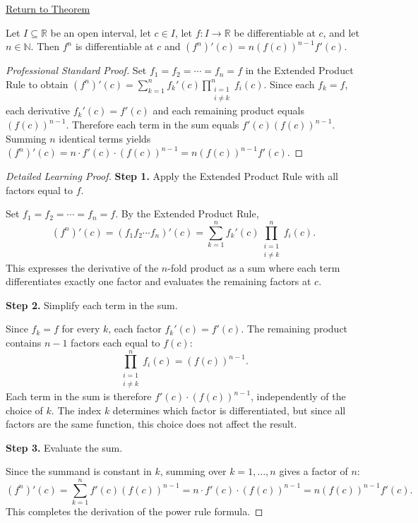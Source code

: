 \newpage
{}
\label{prf:special-case-product-rule}

\begin{remark*}[Return]
\hyperref[cor:power-rule-special-case]{Return to Theorem}
\end{remark*}

\begin{corollary*}
Let $I \subseteq \mathbb{R}$ be an open interval, let $c \in I$, let $f : I \to \mathbb{R}$ be differentiable at $c$, and let $n \in \mathbb{N}$. Then $f^n$ is differentiable at $c$ and $(f^n)'(c) = n(f(c))^{n-1}f'(c)$.
\end{corollary*}

\begin{proof}[Professional Standard Proof]
\LRAProofBodyStart
Set $f_1 = f_2 = \cdots = f_n = f$ in the Extended Product Rule to obtain $(f^n)'(c) = \sum_{k=1}^{n} f_k'(c) \prod_{\substack{i=1\\i\neq k}}^{n} f_i(c)$. Since each $f_k = f$, each derivative $f_k'(c) = f'(c)$ and each remaining product equals $(f(c))^{n-1}$. Therefore each term in the sum equals $f'(c)(f(c))^{n-1}$. Summing $n$ identical terms yields $(f^n)'(c) = n \cdot f'(c) \cdot (f(c))^{n-1} = n(f(c))^{n-1}f'(c)$.
\end{proof}

\begin{proof}[Detailed Learning Proof]
\LRAProofBodyStart

\textbf{Step 1.} Apply the Extended Product Rule with all factors equal to $f$.

Set $f_1 = f_2 = \cdots = f_n = f$. By the Extended Product Rule,
\[
  (f^n)'(c) = (f_1 f_2 \cdots f_n)'(c) = \sum_{k=1}^{n} f_k'(c) \prod_{\substack{i=1\\i\neq k}}^{n} f_i(c).
\]
This expresses the derivative of the $n$-fold product as a sum where each term differentiates exactly one factor and evaluates the remaining factors at $c$.

\textbf{Step 2.} Simplify each term in the sum.

Since $f_k = f$ for every $k$, each factor $f_k'(c) = f'(c)$. The remaining product contains $n-1$ factors each equal to $f(c)$:
\[
  \prod_{\substack{i=1\\i\neq k}}^{n} f_i(c) = (f(c))^{n-1}.
\]
Each term in the sum is therefore $f'(c) \cdot (f(c))^{n-1}$, independently of the choice of $k$. The index $k$ determines which factor is differentiated, but since all factors are the same function, this choice does not affect the result.

\textbf{Step 3.} Evaluate the sum.

Since the summand is constant in $k$, summing over $k = 1, \ldots, n$ gives a factor of $n$:
\[
  (f^n)'(c) = \sum_{k=1}^{n} f'(c)(f(c))^{n-1} = n \cdot f'(c) \cdot (f(c))^{n-1} = n(f(c))^{n-1}f'(c).
\]
This completes the derivation of the power rule formula.
\end{proof}

